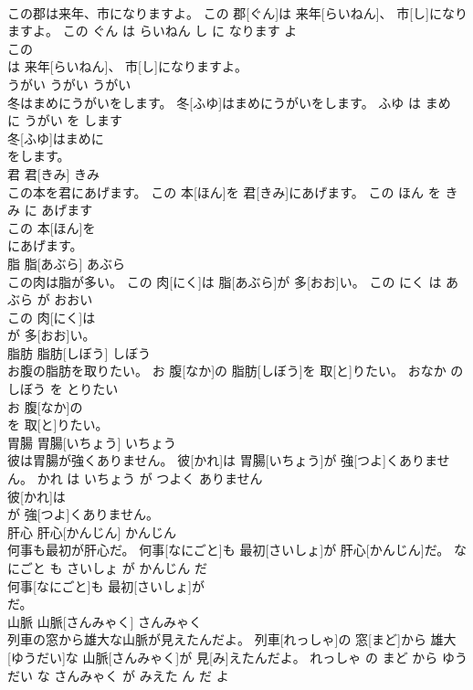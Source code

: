 \documentclass[8pt]{extreport}
\begin{document}
\begin{CJK}{UTF8}{min}
\\	この郡は来年、市になりますよ。	この 郡[ぐん]は 来年[らいねん]、 市[し]になりますよ。	この ぐん は らいねん し に なります よ	
\\	この
\\	は 来年[らいねん]、 市[し]になりますよ。			
\\	うがい	うがい	うがい	
\\	冬はまめにうがいをします。	冬[ふゆ]はまめにうがいをします。	ふゆ は まめ に うがい を します	
\\	冬[ふゆ]はまめに
\\	をします。			
\\	君	君[きみ]	きみ	
\\	この本を君にあげます。	この 本[ほん]を 君[きみ]にあげます。	この ほん を きみ に あげます	
\\	この 本[ほん]を
\\	にあげます。			
\\	脂	脂[あぶら]	あぶら	
\\	この肉は脂が多い。	この 肉[にく]は 脂[あぶら]が 多[おお]い。	この にく は あぶら が おおい	
\\	この 肉[にく]は
\\	が 多[おお]い。			
\\	脂肪	脂肪[しぼう]	しぼう	
\\	お腹の脂肪を取りたい。	お 腹[なか]の 脂肪[しぼう]を 取[と]りたい。	おなか の しぼう を とりたい	
\\	お 腹[なか]の
\\	を 取[と]りたい。			
\\	胃腸	胃腸[いちょう]	いちょう	
\\	彼は胃腸が強くありません。	彼[かれ]は 胃腸[いちょう]が 強[つよ]くありません。	かれ は いちょう が つよく ありません	
\\	彼[かれ]は
\\	が 強[つよ]くありません。			
\\	肝心	肝心[かんじん]	かんじん	
\\	何事も最初が肝心だ。	何事[なにごと]も 最初[さいしょ]が 肝心[かんじん]だ。	なにごと も さいしょ が かんじん だ	
\\	何事[なにごと]も 最初[さいしょ]が
\\	だ。			
\\	山脈	山脈[さんみゃく]	さんみゃく	
\\	列車の窓から雄大な山脈が見えたんだよ。	列車[れっしゃ]の 窓[まど]から 雄大[ゆうだい]な 山脈[さんみゃく]が 見[み]えたんだよ。	れっしゃ の まど から ゆうだい な さんみゃく が みえた ん だ よ	

\end{CJK}
\end{document}
